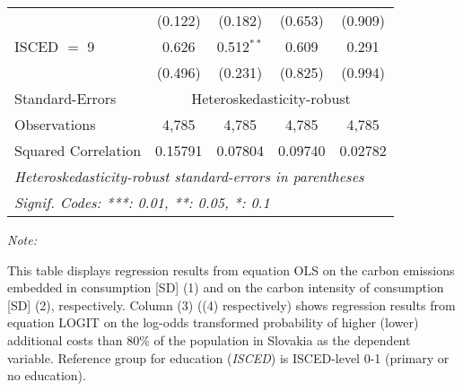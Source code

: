 \begin{table}[htbp!]
\begin{adjustbox}{width = 1\textwidth, max height = 0.95\textheight, center}
\begin{threeparttable}[b]
\begin{tabular}{lcccc}
                                 & (0.122)            & (0.182)            & (0.653)        & (0.909)\\   
            ISCED $=$ 9          & 0.626              & 0.512$^{**}$       & 0.609          & 0.291\\   
                                 & (0.496)            & (0.231)            & (0.825)        & (0.994)\\   
            \midrule 
            Standard-Errors & \multicolumn{4}{c}{Heteroskedasticity-robust} \\ 
            Observations         & 4,785              & 4,785              & 4,785          & 4,785\\  
            Squared Correlation  & 0.15791            & 0.07804            & 0.09740        & 0.02782\\  
            \midrule \midrule
            \multicolumn{5}{l}{\emph{Heteroskedasticity-robust standard-errors in parentheses}}\\
            \multicolumn{5}{l}{\emph{Signif. Codes: ***: 0.01, **: 0.05, *: 0.1}}\\
         \end{tabular}
         
         \begin{tablenotes}\item \medskip \textit{Note:}
            \item This table displays regression results from equation OLS on the carbon emissions embedded in consumption [SD] (1) and on the carbon intensity of consumption [SD] (2), respectively. 
                                      Column (3) ((4) respectively) shows regression results from equation LOGIT on the log-odds transformed probability of higher (lower) additional costs than 80\% of the population in Slovakia as the dependent variable. Reference group for education (\textit{ISCED}) is ISCED-level 0-1 (primary or no education).
         \end{tablenotes}
      \end{threeparttable}
   \end{adjustbox}
\end{table}


